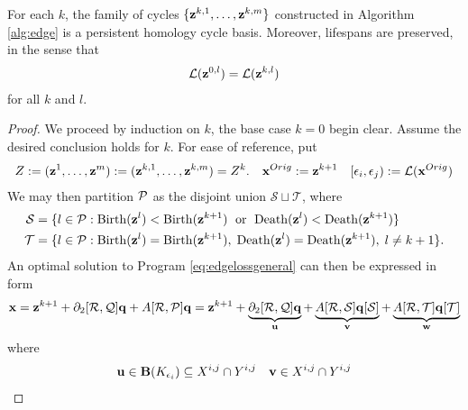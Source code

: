 \documentclass[utf8]{frontiers_suppmat} %
\begin{document}
\newcommand{\vanishset}{\mathcal{S}}
\newcommand{\orderset}{\mathcal{T}}

\begin{theorem}
For each $k$, the family of cycles $\{\mathbf{z}^{k,1}, \ldots, \mathbf{z}^{k,m}\}$ constructed in Algorithm \ref{alg:edge} is a persistent homology cycle basis.  Moreover, lifespans are preserved, in the sense that
    \begin{align}
        \mathcal{L}(\mathbf{z}^{0,l}) = \mathcal{L}(\mathbf{z}^{k,l})
        \label{eq:samelifespan}
    \end{align}
for all $k$ and $l$.
\end{theorem}
\begin{proof}
We proceed by induction on $k$, the base case $k = 0$ begin clear.  Assume the desired conclusion holds for $k$.   For ease of reference, put
    \begin{align*}
        Z := (\mathbf{z}^1, \ldots, \mathbf{z}^m) := (\mathbf{z}^{k,1}, \ldots, \mathbf{z}^{k,m}) = Z^{k}.
        &&
        \mathbf{x}^{Orig} := \mathbf{z}^{k+1}
        &&
        [\epsilon_i, \epsilon_j) := \mathcal{L}(\mathbf{x}^{Orig})
    \end{align*}
We may then partition $\mathcal P$ as the disjoint union $\vanishset \sqcup \orderset$, where 
    \begin{align*}
        \vanishset &= \{l \in \goodcycleindices : \birth(\cycle^l) < \birth(\cycle^{k+1})\; \text{ or } \; \death(\cycle^l) < \death(\cycle^{k+1}) \} \\
        \orderset &= \{l \in \goodcycleindices :  \birth(\cycle^l) = \birth(\cycle^{k+1}), \; \death(\cycle^l) = \death(\cycle^{k+1}), \; l \neq k+1 \}.
    \end{align*}
An optimal solution to Program \eqref{eq:edgelossgeneral} can then be expressed in  form 
    \begin{align*}
        \optimalrep 
        = 
        \obasisel^{k+1} + \partial_2[\goodedges, \goodtriangles] \q + A[\goodedges, \goodcycleindices] \q 
        = 
            \obasisel^{k+1}
            +
            \underbrace{\partial_2[\goodedges, \goodtriangles] \q}_{\cycleu}
            +
            \underbrace{A[\goodedges, \vanishset] \q[\vanishset]}_{\cyclev}
            +
            \underbrace{A[\goodedges, \orderset] \q[\orderset]}_{\cyclew}
    \end{align*}
where 
    \begin{align*}
        \cycleu \in \Boundaries(K_{\epsilon_i}) \subseteq \xij \cap \yij 
        &&
        \cyclev \in \xij \cap \yij

\end{align*}
\end{proof}
\end{document}
